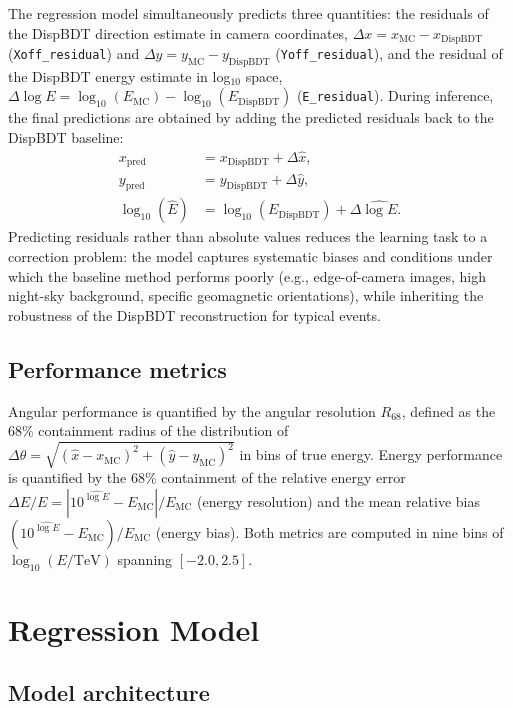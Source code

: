 \documentclass[12pt]{article}
\begin{document}
The regression model simultaneously predicts three quantities:
the residuals of the DispBDT direction estimate in camera coordinates,
$\Delta x = x_\mathrm{MC} - x_\mathrm{DispBDT}$ (\texttt{Xoff\_residual}) and
$\Delta y = y_\mathrm{MC} - y_\mathrm{DispBDT}$ (\texttt{Yoff\_residual}),
and the residual of the DispBDT energy estimate in log$_{10}$ space,
$\Delta\log E = \log_{10}(E_\mathrm{MC}) - \log_{10}(E_\mathrm{DispBDT})$ (\texttt{E\_residual}).
During inference, the final predictions are obtained by adding the predicted
residuals back to the DispBDT baseline:
\begin{align}
  x_\mathrm{pred} &= x_\mathrm{DispBDT} + \Delta\hat{x}, \\
  y_\mathrm{pred} &= y_\mathrm{DispBDT} + \Delta\hat{y}, \\
  \log_{10}(\hat{E}) &= \log_{10}(E_\mathrm{DispBDT}) + \Delta\hat{\log E}.
\end{align}
Predicting residuals rather than absolute values reduces the learning task
to a correction problem: the model captures systematic biases and conditions
under which the baseline method performs poorly
(e.g., edge-of-camera images, high night-sky background, specific geomagnetic orientations),
while inheriting the robustness of the DispBDT reconstruction for typical events.

\subsection{Performance metrics}
\label{sec:metrics}

Angular performance is quantified by the angular resolution $R_{68}$,
defined as the 68\% containment radius of the distribution of
$\Delta\theta = \sqrt{(\hat{x} - x_\mathrm{MC})^2 + (\hat{y} - y_\mathrm{MC})^2}$
in bins of true energy.
Energy performance is quantified by the 68\% containment of the relative
energy error $\Delta E / E = |10^{\hat{\log E}} - E_\mathrm{MC}| / E_\mathrm{MC}$
(energy resolution) and the mean relative bias
$(10^{\hat{\log E}} - E_\mathrm{MC}) / E_\mathrm{MC}$ (energy bias).
Both metrics are computed in nine bins of $\log_{10}(E/\mathrm{TeV})$
spanning $[-2.0, 2.5]$.



\section{Regression Model}
\label{sec:regression}

\subsection{Model architecture}
\end{document}
